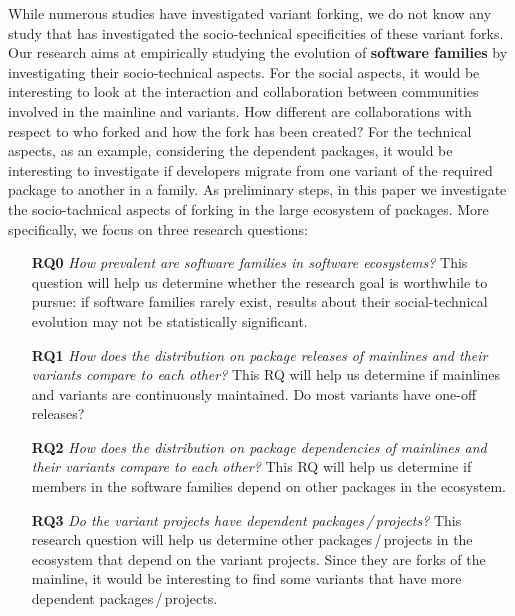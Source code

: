 While numerous studies have investigated variant forking, we do not know any study that has investigated the socio-technical specificities of these variant forks. 
Our research aims at empirically studying the evolution of \textbf{software families} by investigating their socio-technical aspects. 
For the social aspects, it would be interesting to look at the interaction and collaboration between communities involved in the mainline and variants.
How different are collaborations with respect to who forked and how the fork has been created?
For the technical aspects, as an example, considering the dependent packages, it would be interesting to investigate if developers migrate from one variant of the required package to another in a family.
As preliminary steps, in this paper we investigate the socio-tachnical aspects of forking in the large ecosystem of \js \np packages. More specifically, we focus on three research questions:
\begin{itemize}
\item[\textbf{RQ0}] \textit{How prevalent are software families in software ecosystems?} 
This question will help us determine whether the research goal is worthwhile to pursue: if software families rarely exist, results about their social-technical evolution may not be statistically significant.  

\item[\textbf{RQ1}] \textit{How does the distribution on package releases of mainlines and their variants compare to each other? }
This RQ will help us determine if mainlines and variants are continuously maintained. 
Do most variants have one-off releases?

\item[\textbf{RQ2}] \textit{How does the distribution on package dependencies of mainlines and their variants compare to each other?}
This RQ will help us determine if members in the software families depend on other packages in the \np ecosystem.

\item[\textbf{RQ3}] \textit{Do the variant projects have dependent packages\,/\,projects?}
This research question will help us determine other packages\,/\,projects in the ecosystem that depend on the variant projects.
Since they are forks of the mainline, it would be interesting to find some variants that have more dependent packages\,/\,projects.
\end{itemize}

